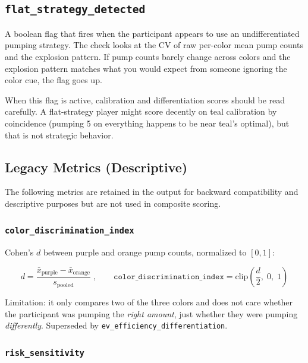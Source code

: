 \documentclass[11pt,a4paper]{article}
\begin{document}
\subsection{\texttt{flat\_strategy\_detected}}

A boolean flag that fires when the participant appears to use an
undifferentiated pumping strategy. The check looks at the CV of raw
per-color mean pump counts and the explosion pattern. If pump counts
barely change across colors and the explosion pattern matches what you
would expect from someone ignoring the color cue, the flag goes up.

When this flag is active, calibration and differentiation scores should be
read carefully. A flat-strategy player might score decently on teal
calibration by coincidence (pumping 5 on everything happens to be near
teal's optimal), but that is not strategic behavior.


\subsection{Legacy Metrics (Descriptive)}

The following metrics are retained in the output for backward compatibility
and descriptive purposes but are not used in composite scoring.

\subsubsection*{\texttt{color\_discrimination\_index}}

Cohen's $d$ between purple and orange pump counts, normalized to $[0, 1]$:

\begin{equation}
    d = \frac{\bar{x}_{\text{purple}} - \bar{x}_{\text{orange}}}
             {s_{\text{pooled}}}
    \;,\qquad
    \texttt{color\_discrimination\_index} = \text{clip}\!\left(\frac{d}{2},\; 0,\; 1\right)
\end{equation}

Limitation: it only compares two of the three colors and does not care
whether the participant was pumping the \emph{right amount}, just whether
they were pumping \emph{differently}. Superseded by
\texttt{ev\_efficiency\_differentiation}.


\subsubsection*{\texttt{risk\_sensitivity}}
\end{document}
